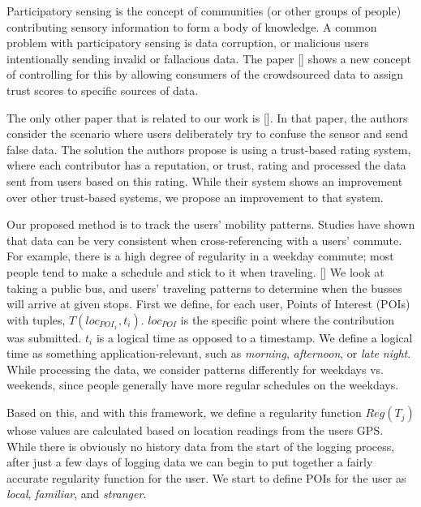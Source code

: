 \documentclass[9pt,twocolumn]{article}
\begin{document}
	Participatory sensing is the concept of communities (or other groups of people) contributing sensory information to form a body of knowledge. %
	A common problem with participatory sensing is data corruption, or malicious users intentionally sending invalid or fallacious data. The paper %
	[] shows a new concept of controlling for this by allowing consumers of the crowdsourced data to assign trust scores to specific sources of data. 
	
	The only other paper that is related to our work is []. %
	In that paper, the authors consider the scenario where users deliberately try to confuse the sensor and send false data. The solution the authors propose is using a trust-based rating system, where each contributor has a reputation, or trust, rating and processed the data sent from users based on this rating. While their system shows an improvement over other trust-based systems, we propose an improvement to that system.
	
	Our proposed method is to track the users' mobility patterns. Studies have shown that data can be very consistent when cross-referencing with a users' commute. For example, there is a high degree of regularity in a weekday commute; most people tend to make a schedule and stick to it when traveling. [] %
	We look at taking a public bus, and users' traveling patterns to determine when the busses will arrive at given stops. First we define, for each user, Points of Interest (POIs) with tuples, $T(loc_{POI_x}, t_i)$. $loc_{POI}$ is the specific point where the contribution was submitted. $t_i$ is a logical time as opposed to a timestamp. We define a logical time as something application-relevant, such as \emph{morning}, \emph{afternoon}, or \emph{late night}.
	While processing the data, we consider patterns differently for weekdays vs. weekends, since people generally have more regular schedules on the weekdays. %
	
	Based on this, and with this framework, we define a regularity function $Reg(T_j)$ whose values are calculated based on location readings from the users GPS.
	While there is obviously no history data from the start of the logging process, after just a few days of logging data we can begin to put together a fairly accurate regularity function for the user. We start to define POIs for the user as \emph{local}, \emph{familiar}, and \emph{stranger}. 
	
\end{document}
